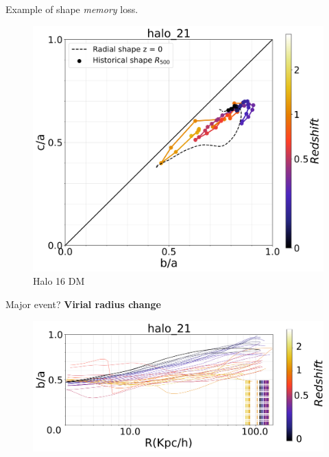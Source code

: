 \documentclass[xcolor=dvipsnames]{beamer}
\begin{document}
\begin{frame}
\centering
Example of shape \textit{memory} loss.
\begin{figure}[!ht]
  \centering
 \includegraphics[width=0.7\columnwidth]{../Document/pics/Redshift/halo_21_level3_DM_Z_Triax.png}
 \caption{Halo 16 DM}
  

  \label{fig:RedshiftDM}
\end{figure}
\end{frame}


\begin{frame}
Major event? \textbf{Virial radius change}
\begin{figure}[!ht]
  \centering
  \includegraphics[width=1\columnwidth]{./pics/halo_21_level3_DM_Z.png}
\end{figure}

\end{frame}
\end{document}
